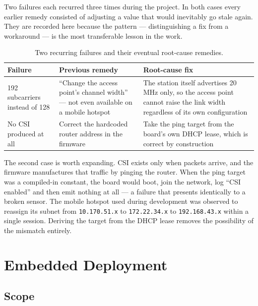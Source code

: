 \documentclass[11pt,a4paper]{article}
\newcommand{\code}[1]{\texttt{\small #1}}
\begin{document}
Two failures each recurred three times during the project. In both cases every
earlier remedy consisted of adjusting a value that would inevitably go stale
again. They are recorded here because the pattern --- distinguishing a fix from
a workaround --- is the most transferable lesson in the work.

\begin{table}[H]
\centering
\caption{Two recurring failures and their eventual root-cause remedies.}
\begin{tabularx}{\linewidth}{@{}lXX@{}}
\toprule
\textbf{Failure} & \textbf{Previous remedy} & \textbf{Root-cause fix} \\
\midrule
192 subcarriers instead of 128 &
``Change the access point's channel width'' --- not even available on a mobile
hotspot &
The station itself advertises 20\,MHz only, so the access point cannot raise the
link width regardless of its own configuration \\
\addlinespace
No CSI produced at all &
Correct the hardcoded router address in the firmware &
Take the ping target from the board's own DHCP lease, which is correct by
construction \\
\bottomrule
\end{tabularx}
\end{table}

\noindent
The second case is worth expanding. CSI exists only when packets arrive, and the
firmware manufactures that traffic by pinging the router. When the ping target
was a compiled-in constant, the board would boot, join the network, log ``CSI
enabled'' and then emit nothing at all --- a failure that presents identically
to a broken sensor. The mobile hotspot used during development was observed to
reassign its subnet from \code{10.170.51.x} to \code{172.22.34.x} to
\code{192.168.43.x} within a single session. Deriving the target from the DHCP
lease removes the possibility of the mismatch entirely.

\section{Embedded Deployment}
\label{sec:embedded}

\subsection{Scope}
\end{document}
